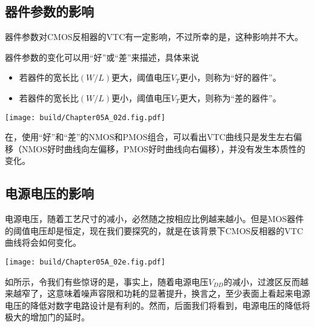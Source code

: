\subsection{器件参数的影响}
器件参数对CMOS反相器的VTC有一定影响，不过所幸的是，这种影响并不大。\goodbreak

器件参数的变化可以用“好”或“差”来描述，具体来说
\begin{itemize}
    \item 若器件的宽长比$(W/L)$更大，阈值电压$V_{T}$更小，则称为“好的器件”。
    \item 若器件的宽长比$(W/L)$更小，阈值电压$V_{T}$更大，则称为“差的器件”。
\end{itemize}
\begin{Figure}[器件参数的影响]
    \texttt{[image: build/Chapter05A\_02d.fig.pdf]}\hspace{0.7cm}
\end{Figure}
在，使用“好”和“差”的NMOS和PMOS组合，可以看出VTC曲线只是发生左右偏移（NMOS好时曲线向左偏移，PMOS好时曲线向右偏移），并没有发生本质性的变化。

\subsection{电源电压的影响}
电源电压，随着工艺尺寸的减小，必然随之按相应比例越来越小。但是MOS器件的阈值电压却是恒定，现在我们要探究的，就是在该背景下CMOS反相器的VTC曲线将会如何变化。
\begin{Figure}[器件参数的影响]
    \texttt{[image: build/Chapter05A\_02e.fig.pdf]}\hspace{0.7cm}
\end{Figure}
如所示，令我们有些惊讶的是，事实上，随着电源电压$V_{DD}$的减小，过渡区反而越来越窄了，这意味着噪声容限和功耗的显著提升，换言之，至少表面上看起来电源电压的降低对数字电路设计是有利的。然而，后面我们将看到，电源电压的降低将极大的增加门的延时。